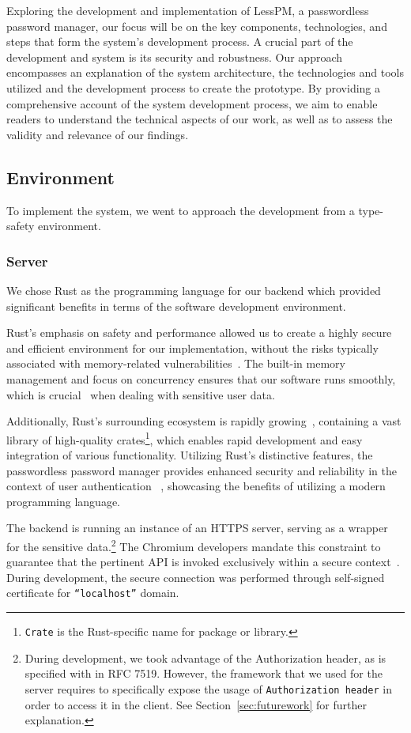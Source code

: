 Exploring the development and implementation of LessPM, a passwordless password
manager, our focus will be on the key components, technologies, and steps
that form the system's development process.
A crucial part of the development and system is its security and robustness.
Our approach encompasses an explanation of the system architecture, the
technologies and tools utilized and the development process to create the
prototype.
By providing a comprehensive account of the system development process, we
aim to enable readers to understand the technical aspects of our work, as well
as to assess the validity and relevance of our findings.

\subsection{Environment}\label{subsec:environment}
To implement the system, we went to approach the development from a type-safety
environment.

\subsubsection{Server}
We chose Rust as the programming language for our backend which provided
significant benefits in terms of the software development environment.

Rust's emphasis on safety and performance allowed us to create a highly
secure and efficient environment for our implementation, without the risks
typically associated with memory-related
vulnerabilities~\cite{rivera2019preserving}.
The built-in memory management and focus on concurrency ensures that our
software runs smoothly, which is crucial~\cite{fischer1985impossibility}
when dealing with sensitive user data.

Additionally, Rust's surrounding ecosystem is rapidly
growing~\cite{librs-stats}, containing a vast library of high-quality
crates\footnote{
  \texttt{Crate} is the Rust-specific name for package or library.
}, which enables rapid development and easy integration of various
functionality.
Utilizing Rust's distinctive features, the passwordless password manager provides
enhanced security and reliability in the context of user authentication
~\cite{rivera2019preserving}, showcasing the benefits of utilizing a modern
programming language.

The backend is running an instance of an HTTPS server, serving as a wrapper
for the sensitive data.\footnote{
  During development, we took advantage of the Authorization header, as is
  specified with in RFC 7519.
  However, the framework that we used for the server requires to specifically
  expose the usage of \texttt{Authorization header} in order to access it in the
  client.
  See Section~\ref{sec:futurework} for further explanation.
}
The Chromium developers mandate this constraint to guarantee that the pertinent
API is invoked exclusively within a secure context~\cite{webdev2021credential}.
During development, the secure connection was performed through self-signed
certificate for \texttt{``localhost''} domain.

